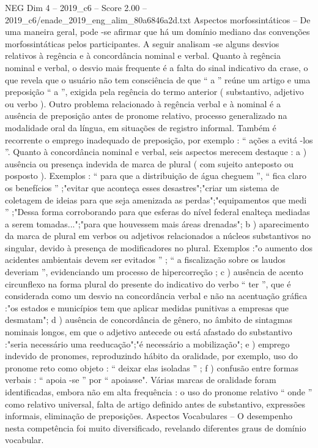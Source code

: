 \begin{textsample}{NEG Dim 4 – 2019\_c6 – Score 2.00 – 2019\_c6/enade\_2019\_eng\_alim\_80a6846a2d.txt}
Aspectos morfossintáticos – De uma maneira geral, pode -se afirmar que há um domínio mediano das convenções morfossintáticas pelos participantes.
A seguir analisam -se alguns desvios relativos à regência e à concordância nominal e verbal.
Quanto à regência nominal e verbal, o desvio mais frequente é a falta do sinal indicativo da crase, o que revela que o usuário não tem consciência de que “ a ” reúne um artigo e uma preposição “ a ”, exigida pela regência do termo anterior ( substantivo, adjetivo ou verbo ).
Outro problema relacionado à regência verbal e à nominal é a ausência de preposição antes de pronome relativo, processo generalizado na modalidade oral da língua, em situações de registro informal.
Também é recorrente o emprego inadequado de preposição, por exemplo : “ ações a evitá -los ”.
Quanto à concordância nominal e verbal, seis aspectos merecem destaque : a ) ausência ou presença indevida de marca de plural ( com sujeito anteposto ou posposto ).
Exemplos : “ para que a distribuição de água cheguem ”, “ fica claro os benefícios ” ;"evitar que aconteça esses desastres";"criar um sistema de coletagem de ideias para que seja amenizada as perdas";"equipamentos que medi ” ;"Dessa forma corroborando para que esferas do nível federal enalteça mediadas a serem tomadas...";"para que houvessem mais áreas drenadas"; b ) aparecimento da marca de plural em verbos ou adjetivos relacionados a núcleos substantivos no singular, devido à presença de modificadores no plural.
Exemplos :"o aumento dos acidentes ambientais devem ser evitados ” ; “ a fiscalização sobre os laudos deveriam ”, evidenciando um processo de hipercorreção ; c ) ausência de acento circunflexo na forma plural do presente do indicativo do verbo “ ter ”, que é considerada como um desvio na concordância verbal e não na acentuação gráfica :"os estados e municípios tem que aplicar medidas punitivas a empresas que desmatam"; d ) ausência de concordância de gênero, no âmbito de sintagmas nominais longos, em que o adjetivo antecede ou está afastado do substantivo :"seria necessário uma reeducação";"é necessário a mobilização"; e ) emprego indevido de pronomes, reproduzindo hábito da oralidade, por exemplo, uso do pronome reto como objeto : “ deixar elas isoladas ” ; f ) confusão entre formas verbais : “ apoia -se ” por “ apoiasse".
Várias marcas de oralidade foram identificadas, embora não em alta frequência : o uso do pronome relativo “ onde ” como relativo universal, falta de artigo definido antes de substantivo, expressões informais, eliminação de preposições.
Aspectos Vocabulares – O desempenho nesta competência foi muito diversificado, revelando diferentes graus de domínio vocabular.

\end{textsample}
